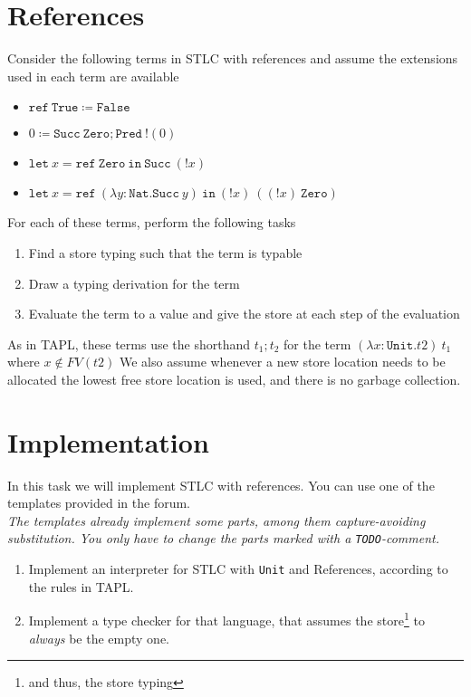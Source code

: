 \section{References}
Consider the following terms in STLC with references and assume the extensions used in each term are available 
\begin{itemize}
  \item $\mathtt{ref}\ \mathtt{True} \coloneq \mathtt{False}$
  \item $0\coloneq \mathtt{Succ}\ \mathtt{Zero}; \mathtt{Pred}\ !(0)$
  \item $\mathtt{let}\ x = \mathtt{ref}\ \mathtt{Zero}\ \mathtt{in}\ \mathtt{Succ}\ (!x)$
  \item $\mathtt{let}\ x = \mathtt{ref}\ (\lambda y:\mathtt{Nat}.\mathtt{Succ}\ y)\ \mathtt{in}\ (!x)\ ((!x)\ \mathtt{Zero})$
\end{itemize}

For each of these terms, perform the following tasks
\begin{enumerate}
  \item Find a store typing such that the term is typable 
  \item Draw a typing derivation for the term
  \item Evaluate the term to a value and give the store at each step of the evaluation
\end{enumerate}

As in TAPL, these terms use the shorthand $t_1;t_2$ for the term $(\lambda x:\mathtt{Unit}.t2)\ t_1$ where $x\notin FV(t2)$
We also assume whenever a new store location needs to be allocated the lowest free store location is used, and there is no garbage collection.

\section{Implementation}
In this task we will implement STLC with references.
You can use one of the templates provided in the forum.\\
\emph{
    The templates already implement some parts, among them capture-avoiding substitution.
    You only have to change the parts marked with a \texttt{TODO}-comment.
}

\begin{enumerate}
  \item Implement an interpreter for STLC with {\texttt{Unit}} and References, according to the rules in TAPL.
  \item Implement a type checker for that language,
    that assumes the store\footnote{and thus, the store typing} to \emph{always} be the empty one.
\end{enumerate}
